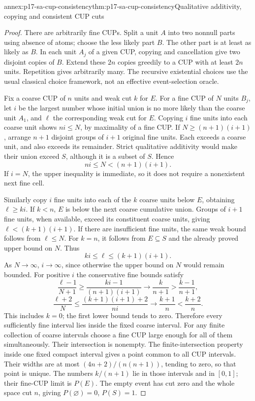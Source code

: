 \begin{annexitem}{annex:p17-sa-cup-consistency}{thm:p17-sa-cup-consistency}{Qualitative additivity, copying and consistent CUP cuts}
\begin{proof}
There are arbitrarily fine CUPs. Split a unit \(A\) into
two nonnull parts using absence of atoms; choose the less
likely part \(B\). The other part is at least as likely
as \(B\). In each unit \(A_j\) of a given CUP, copying
and cancellation give two disjoint copies of \(B\).
Extend these \(2n\) copies greedily to a CUP with at least
\(2n\) units. Repetition gives arbitrarily many.
The recursive existential choices use the usual classical
choice framework, not an effective event-selection oracle.

Fix a coarse CUP of \(n\) units and weak cut \(k\) for \(E\).
For a fine CUP of \(N\) units \(B_j\), let \(i\) be the
largest number whose initial union is no more likely than
the coarse unit \(A_1\), and \(\ell\) the corresponding
weak cut for \(E\).
Copying \(i\) fine units into each coarse unit shows
\(ni\leq N\), by maximality of a fine CUP.
If \(N\geq(n+1)(i+1)\), arrange \(n+1\) disjoint groups
of \(i+1\) original fine units. Each exceeds a coarse unit,
and also exceeds its remainder. Strict qualitative additivity
would make their union exceed \(S\), although it is a subset
of \(S\). Hence
\[
 ni\leq N<(n+1)(i+1).
\]
If \(i=N\), the upper inequality is immediate, so it does
not require a nonexistent next fine cell.

Similarly copy \(i\) fine units into each of the \(k\)
coarse units below \(E\), obtaining \(\ell\geq ki\).
If \(k<n\), \(E\) is below the next coarse cumulative
union. Groups of \(i+1\) fine units, when available, exceed
its constituent coarse units, giving
\(\ell<(k+1)(i+1)\). If there are insufficient fine units,
the same weak bound follows from \(\ell\leq N\).
For \(k=n\), it follows from \(E\subseteq S\) and the
already proved upper bound on \(N\). Thus
\[
 ki\leq\ell\leq(k+1)(i+1).
\]
As \(N\to\infty\), \(i\to\infty\), since otherwise the
upper bound on \(N\) would remain bounded.
For positive \(i\) the conservative fine bounds satisfy
\[
 \frac{\ell-1}{N+1}
 \geq\frac{ki-1}{(n+1)(i+1)}
 \longrightarrow\frac{k}{n+1}>
 \frac{k-1}{n+1},
\]
\[
 \frac{\ell+2}{N}
 \leq\frac{(k+1)(i+1)+2}{ni}
 \longrightarrow\frac{k+1}{n}<
 \frac{k+2}{n}.
\]
This includes \(k=0\); the first lower bound tends to zero.
Therefore every sufficiently fine interval lies inside
the fixed coarse interval. For any finite collection of
coarse intervals choose a fine CUP large enough for all
of them simultaneously. Their intersection is nonempty.
The finite-intersection property inside one fixed compact
interval gives a point common to all CUP intervals.
Their widths are at most \((4n+2)/(n(n+1))\), tending to
zero, so that point is unique.
The numbers \(k/(n+1)\) lie in those intervals and in
\([0,1]\); their fine-CUP limit is \(P(E)\).
The empty event has cut zero and the whole space cut \(n\),
giving \(P(\varnothing)=0\), \(P(S)=1\).


\end{proof}
\end{annexitem}
